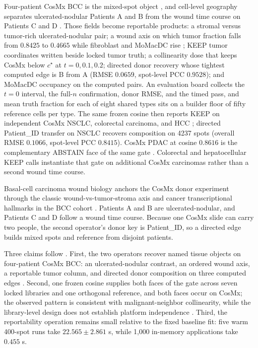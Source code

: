 Four-patient CosMx BCC is the mixed-spot object \citep{Andreatta2024zenodo,Yerly2022,Yerly2025preprint}, and cell-level geography separates ulcerated-nodular Patients A and B from the wound time course on Patients C and D \citep{Yerly2025preprint,Dvorak1986}. Those fields become reportable products: a stromal versus tumor-rich ulcerated-nodular pair; a wound axis on which tumor fraction falls from \(0.8425\) to \(0.4665\) while fibroblast and MoMacDC rise \citep{Yerly2025preprint,Dvorak1986}; KEEP tumor coordinates written beside locked tumor truth; a collinearity dose that keeps CosMx below \(c^\star\) at \(t=0,0.1,0.2\); directed donor recovery whose tightest computed edge is B from A (RMSE \(0.0659\), spot-level PCC \(0.9528\)); and MoMacDC occupancy on the computed pairs. An evaluation board collects the \(t=0\) interval, the full-\(n\) confirmation, donor RMSE, and the timed pass, and mean truth fraction for each of eight shared types sits on a builder floor of fifty reference cells per type. The same frozen cosine then reports KEEP on independent CosMx NSCLC, colorectal carcinoma, and HCC \citep{He2022,Crowell2025preprint,Sun2025spatial}; directed Patient\_ID transfer on NSCLC recovers composition on 4237 spots (overall RMSE \(0.1066\), spot-level PCC \(0.8415\)). CosMx PDAC at cosine \(0.8616\) is the complementary ABSTAIN face of the same gate \citep{Pei2025}. Colorectal and hepatocellular KEEP calls instantiate that gate on additional CosMx carcinomas rather than a second wound time course.

Basal-cell carcinoma wound biology anchors the CosMx donor experiment through the classic wound-vs-tumor-stroma axis \citep{Dvorak1986} and cancer transcriptional hallmarks in the BCC cohort \citep{Gavish2023,Yerly2022,Yerly2025preprint,Andreatta2024zenodo}. Patients A and B are ulcerated-nodular, and Patients C and D follow a wound time course. Because one CosMx slide can carry two people, the second operator's donor key is Patient\_ID, so a directed edge builds mixed spots and reference from disjoint patients.

Three claims follow \citep{Elhanani2023,Cable2022}. First, the two operators recover named tissue objects on four-patient CosMx BCC: an ulcerated-nodular contrast, an ordered wound axis, a reportable tumor column, and directed donor composition on three computed edges \citep{Andreatta2024zenodo,Yerly2025preprint}. Second, one frozen cosine supplies both faces of the gate across seven locked libraries and one orthogonal reference, and both faces occur on CosMx; the observed pattern is consistent with malignant-neighbor collinearity, while the library-level design does not establish platform independence \citep{Kiselev2018,deKanter2019,He2022,Crowell2025preprint,Pei2025}. Third, the reportability operation remains small relative to the fixed baseline fit: five warm 400-spot runs take \(22.565\pm2.861\) s, while 1,000 in-memory applications take \(0.455\) s.
